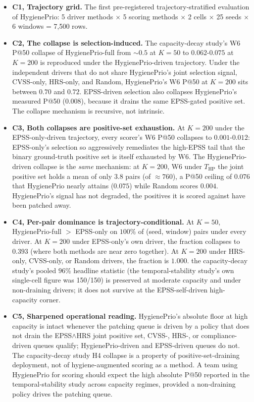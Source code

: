 \begin{itemize}
\item \textbf{C1, Trajectory grid.} The first pre-registered
trajectory-stratified evaluation of HygienePrio: 5 driver methods
$\times$ 5 scoring methods $\times$ 2 cells $\times$ 25 seeds
$\times$ 6 windows = 7{,}500 rows.

\item \textbf{C2, The collapse is selection-induced.} The capacity-decay study's
W6 P@50 collapse of HygienePrio-full from $\sim 0.5$ at $K = 50$ to
$0.062$-$0.075$ at $K = 200$ is reproduced under the
HygienePrio-driven trajectory. Under the independent drivers that do
not share HygienePrio's joint selection signal, CVSS-only,
HRS-only, and Random, HygienePrio's W6 P@50 at $K = 200$ sits
between $0.70$ and $0.72$. EPSS-driven selection also collapses
HygienePrio's measured P@50 ($0.008$), because it drains the same
EPSS-gated positive set. The collapse mechanism is recursive, not
intrinsic.

\item \textbf{C3, Both collapses are positive-set exhaustion.} At
$K = 200$ under the EPSS-only-driven trajectory, every scorer's W6
P@50 collapses to $0.001$-$0.012$: EPSS-only's selection so
aggressively remediates the high-EPSS tail that the binary
ground-truth positive set is itself exhausted by W6. The
HygienePrio-driven collapse is the \emph{same} mechanism: at
$K = 200$, W6 under $T_{\mathrm{HP}}$ the joint positive set holds a
mean of only $3.8$ pairs (of $\approx 760$), a P@50 ceiling of
$0.076$ that HygienePrio nearly attains ($0.075$) while Random scores
$0.004$. HygienePrio's signal has not degraded, the positives it
is scored against have been patched away.

\item \textbf{C4, Per-pair dominance is trajectory-conditional.}
At $K = 50$, HygienePrio-full $>$ EPSS-only on $100\%$ of (seed,
window) pairs under every driver. At $K = 200$ under
EPSS-only's own driver, the fraction collapses to $0.393$
(where both methods are near zero together). At $K = 200$ under
HRS-only, CVSS-only, or Random drivers, the fraction is $1.000$.
the capacity-decay study's pooled $96\%$ headline statistic (the temporal-stability study's own
single-cell figure was 150/150) is preserved at moderate
capacity and under non-draining drivers; it does not survive at the
EPSS-self-driven high-capacity corner.

\item \textbf{C5, Sharpened operational reading.} HygienePrio's
absolute floor at high capacity is intact whenever the patching
queue is driven by a policy that does not drain the
EPSS$\wedge$HRS joint positive set, CVSS-, HRS-, or
compliance-driven queues qualify; HygienePrio-driven and
EPSS-driven queues do not. The capacity-decay study H4 collapse is a property of
positive-set-draining deployment, not of hygiene-augmented scoring
as a method. A team using HygienePrio for scoring should expect
the high absolute P@50 reported in the temporal-stability study across capacity
regimes, provided a non-draining policy drives the patching queue.
\end{itemize}

